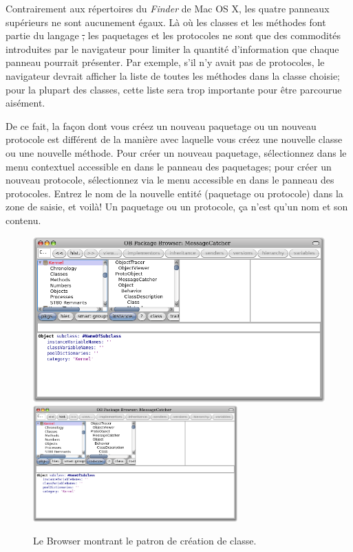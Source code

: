\documentclass[a4paper,10pt,twoside]{book}
\begin{document}
Contrairement aux répertoires du \emph{Finder} de Mac OS X, les quatre panneaux 
supérieurs ne sont aucunement égaux.
Là où les classes et les méthodes font partie du langage \st,
les paquetages et les protocoles ne sont que des commodités
introduites par le navigateur pour limiter la quantité d'information que chaque panneau pourrait présenter.
Par exemple, s'il n'y avait pas de protocoles, le navigateur devrait afficher
la liste de toutes les méthodes dans la classe choisie; pour la plupart des classes, 
cette liste sera trop importante pour être parcourue aisément.

De ce fait, la façon dont vous créez un nouveau paquetage ou
un nouveau protocole est différent de la manière avec laquelle
vous créez une nouvelle classe ou une nouvelle méthode. 
Pour créer un nouveau paquetage, sélectionnez 
  dans le menu contextuel accessible 
en \actclickant dans le  panneau des paquetages; 
pour créer un nouveau protocole, sélectionnez  via 
le menu accessible en \actclickant dans le panneau des protocoles.
Entrez le nom de la nouvelle entité (paquetage ou protocole) dans
la zone de saisie, et voilà! 
Un paquetage ou un protocole, ça n'est qu'un nom et son contenu.

\begin{figure}[htbp]
   \centering
   \ifluluelse
	   {\includegraphics[width=\textwidth]{SystemBrowserClassCreation}}
	   {\includegraphics[width=0.7\textwidth]{SystemBrowserClassCreation}}
   \caption{Le Browser montrant le patron de création de classe.
   }
\end{figure}
\end{document}
